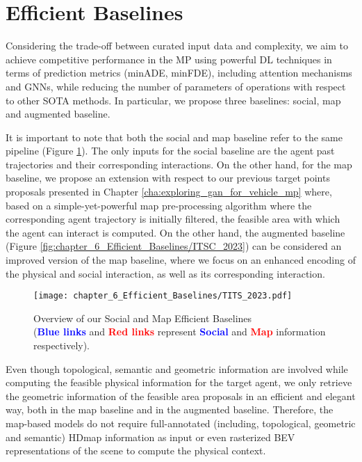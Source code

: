 \section{Efficient Baselines}
\label{sec:6_efficient_baselines}

Considering the trade-off between curated input data and complexity, we aim to achieve competitive performance in the \ac{MP} using powerful DL techniques in terms of prediction metrics (\ac{minADE}, \ac{minFDE}), including attention mechanisms and \acp{GNN}, while reducing the number of parameters of operations with respect to other \ac{SOTA} methods. In particular, we propose three baselines: social, map and augmented baseline. 

It is important to note that both the social and map baseline refer to the same pipeline (Figure \ref{fig:chapter_6_Efficient_Baselines/TITS_2023}). The only inputs for the social baseline are the agent past trajectories and their corresponding interactions. On the other hand, for the map baseline, we propose an extension with respect to our previous target points proposals presented in Chapter \ref{cha:exploring_gan_for_vehicle_mp} where, based on a simple-yet-powerful map pre-processing algorithm where the corresponding agent trajectory is initially filtered, the feasible area with which the agent can interact is computed. On the other hand, the augmented baseline (Figure \ref{fig:chapter_6_Efficient_Baselines/ITSC_2023}) can be considered an improved version of the map baseline, where we focus on an enhanced encoding of the physical and social interaction, as well as its corresponding interaction. 

\begin{figure}[!h]
	\centering
	\setlength{\tabcolsep}{2.0pt}
	\texttt{[image: chapter\_6\_Efficient\_Baselines/TITS\_2023.pdf]}
	\caption[Overview of our Social and Map Efficient Baselines]{Overview of our Social and Map Efficient Baselines \\ (\textbf{\textcolor{blue}{Blue links}} and \textbf{\textcolor{red}{Red links}} represent \textbf{\textcolor{blue}{Social}} and \textbf{\textcolor{red}{Map}} information respectively).}
	\label{fig:chapter_6_Efficient_Baselines/TITS_2023}
\end{figure}

Even though topological, semantic and geometric information are involved while computing the feasible physical information for the target agent, we only retrieve the geometric information of the feasible area proposals in an efficient and elegant way, both in the map baseline and in the augmented baseline. Therefore, the map-based models do not require full-annotated (including, topological, geometric and semantic) \ac{HDmap} information as input or even rasterized \ac{BEV} representations of the scene to compute the physical context. 

